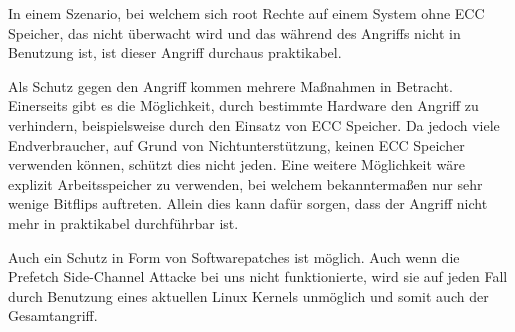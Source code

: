 In einem Szenario, bei welchem sich root Rechte auf einem System ohne ECC Speicher, das nicht überwacht wird und das während des Angriffs nicht in Benutzung ist, ist dieser Angriff durchaus praktikabel.

Als Schutz gegen den Angriff kommen mehrere Maßnahmen in Betracht. Einerseits gibt es die Möglichkeit, durch bestimmte Hardware den Angriff zu verhindern, beispielsweise durch den Einsatz von ECC Speicher. Da jedoch viele Endverbraucher, auf Grund von Nichtunterstützung, keinen ECC Speicher verwenden können, schützt dies nicht jeden. Eine weitere Möglichkeit wäre explizit Arbeitsspeicher zu verwenden, bei welchem bekanntermaßen nur sehr wenige Bitflips auftreten. Allein dies kann dafür sorgen, dass der Angriff nicht mehr in praktikabel durchführbar ist.

Auch ein Schutz in Form von Softwarepatches ist möglich. Auch wenn die Prefetch Side-Channel Attacke bei uns nicht funktionierte, wird sie auf jeden Fall durch Benutzung eines aktuellen Linux Kernels unmöglich und somit auch der Gesamtangriff.